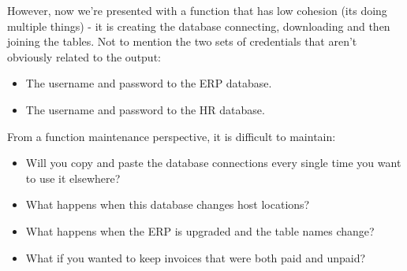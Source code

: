 \documentclass[
]{book}
\newenvironment{Shaded}{\begin{snugshade}}{\end{snugshade}}
\newcommand{\ControlFlowTok}[1]{\textcolor[rgb]{0.13,0.29,0.53}{\textbf{#1}}}
\newcommand{\DataTypeTok}[1]{\textcolor[rgb]{0.13,0.29,0.53}{#1}}
\newcommand{\DecValTok}[1]{\textcolor[rgb]{0.00,0.00,0.81}{#1}}
\newcommand{\KeywordTok}[1]{\textcolor[rgb]{0.13,0.29,0.53}{\textbf{#1}}}
\newcommand{\NormalTok}[1]{#1}
\newcommand{\OperatorTok}[1]{\textcolor[rgb]{0.81,0.36,0.00}{\textbf{#1}}}
\newcommand{\StringTok}[1]{\textcolor[rgb]{0.31,0.60,0.02}{#1}}
\providecommand{\tightlist}{%
  \setlength{\itemsep}{0pt}\setlength{\parskip}{0pt}}
\begin{document}
\begin{Shaded}
\end{Shaded}

However, now we're presented with a function that has low cohesion (its doing multiple things) - it is creating the database connecting, downloading and then joining the tables. Not to mention the two sets of credentials that aren't obviously related to the output:

\begin{itemize}
\tightlist
\item
  The username and password to the ERP database.
\item
  The username and password to the HR database.
\end{itemize}

From a function maintenance perspective, it is difficult to maintain:

\begin{itemize}
\tightlist
\item
  Will you copy and paste the database connections every single time you want to use it elsewhere?
\item
  What happens when this database changes host locations?
\item
  What happens when the ERP is upgraded and the table names change?
\item
  What if you wanted to keep invoices that were both paid and unpaid?
\end{itemize}
\end{document}
